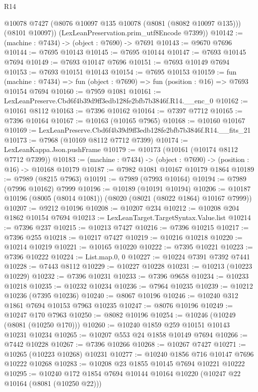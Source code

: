\begin{lexlean}{R14}
\begin{coremodule}
        @10078
        @7427
        (@8076 @10097 @135 @10078 (@8081 (@8082 @10097 @135)))
        (@8101 @10097))
      (LexLeanPreservation.prim_utf8Encode @7399))
@10142 := (machine : @7434) -> (object : @7690) -> @7691
@10143 := @9670 @7696
@10144 := @7695 @10143
@10145 := @7695 @10144
@10147 := @7693 @10145 @7694
@10149 := @7693 @10147 @7696
@10151 := @7693 @10149 @7694
@10153 := @7693 @10151 @10143
@10154 := @7695 @10153
@10159 := fun (machine : @7434) =>
  fun (object : @7690) => fun (position : @16) => @7693 @10154 @7694
@10160 := @7959 @1081
@10161 := LexLeanPreserve.Cbd6f4b39d9ff3edb128fe2bfb7b3846f.R14.__enc_0
@10162 := @10161 @8112
@10163 := @7396 @10162
@10164 := @7397 @7712
@10165 := @7396 @10164
@10167 := @10163 (@10165 @7965)
@10168 := @10160 @10167
@10169 := LexLeanPreserve.Cbd6f4b39d9ff3edb128fe2bfb7b3846f.R14.__fits_21
@10173 := @7968 (@10169 @8112 @7712 @7399)
@10174 := LexLeanKappa.Json.pushFrame
@10179 := @10173 (@10161 (@10174 @8112 @7712 @7399))
@10183 := (machine : @7434) -> (object : @7690) -> (position : @16) -> @10168 @10179
@10187 := @7982 @1081 @10167 @10179 @1864
@10189 := @7989 (@8215 @7963)
@10191 := @7989 (@7993 @10164)
@10194 := @7989 (@7996 @10162) @7999
@10196 := @10189 (@10191 @10194)
@10206 := @10187 @10196 (@8005 (@8014 @1081)) (@8020 (@8021 (@8022 @1864) @10167 @7999))
@10207 := @9212 @10196
@10208 := @10207 @234
@10212 := @10208 @204 @1862 @10154 @7694
@10213 := LexLeanTarget.TargetSyntax.Value.list
@10214 := @7396 @237
@10215 := @10213 @7427
@10216 := @7396 @10215
@10217 := @7396 @255
@10218 := @10217 @7427
@10219 := @10216 @10218
@10220 := @10214 @10219
@10221 := @10165 @10220
@10222 := @7395 @10221
@10223 := @7396 @10222
@10224 := List.map.{0, 0}
@10227 := @10224 @7391 @7392 @7441
@10228 := @7443 @8112
@10229 := @10227 @10228
@10231 := @10213 (@10223 @10229)
@10232 := @7396 @10231
@10233 := @7396 @9658
@10234 := @10233 @10218
@10235 := @10232 @10234
@10236 := @7964 @10235
@10239 := @10212 @10236 (@7395 @10236)
@10240 := @8067 @10196
@10246 := @10240 @312 @1861 @7694 @10153 @7963 @10235
@10247 := @8076 @10196
@10249 := @10247 @170 @7963
@10250 := @8082 @10196
@10254 := @10246 (@10249 (@8081 (@10250 @170)))
@10260 := @10240 @1859 @259 @10151 @10143 @10231 @10234
@10265 := @10207 @553 @24 @1858 @10149 @7694
@10266 := @7442 @10228
@10267 := @7396 @10266
@10268 := @10267 @7427
@10271 := @10265 (@10223 @10268) @10231
@10277 := @10240 @1856 @716 @10147 @7696 @10222 @10268
@10283 := @10208 @23 @1855 @10145 @7694 @10221 @10222
@10295 := @10240 @172 @1854 @7694 @10144 @10164 @10220 (@10247 @22 @10164 (@8081 (@10250 @22)))

\end{coremodule}
\end{lexlean}
